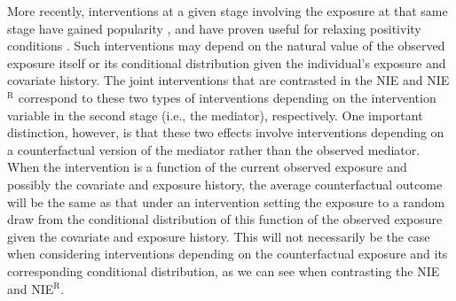 \documentclass[12pt]{article}
\begin{document}
More recently, interventions at a given stage involving the exposure at that same stage have gained popularity \citep{taubman2009intervening, munoz2012population, moore2012causal, haneuse2013estimation, %
young2019inverse, sani2020identification}, and have proven useful for relaxing positivity conditions \citep{kennedy2019nonparametric, papadogeorgou2019causal}. %
Such interventions may depend on the natural value of the observed exposure itself or its conditional distribution given the individual's exposure and covariate history. The joint interventions that are contrasted in the NIE and NIE$^{\text{R}}$ correspond to these two types of interventions depending on the intervention variable in the second stage (i.e., the mediator), respectively. One important distinction, however, is that these two effects involve interventions depending on a counterfactual version of the mediator rather than the observed mediator. When the intervention is a function of the current observed exposure and possibly the covariate and exposure history, the average counterfactual outcome will be the same as that under an intervention setting the exposure to a random draw from the conditional distribution of this function of the observed exposure given the covariate and exposure history. This will not necessarily be the case when considering interventions depending on the counterfactual exposure and its corresponding conditional distribution, as we can see when contrasting the NIE and NIE$^{\text{R}}$.
\end{document}
